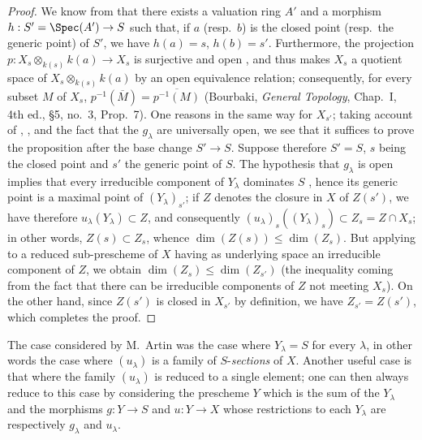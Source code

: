 \begin{proof}
We know from  that there exists a valuation ring $A'$ and a morphism $h:S'=\Spec(A')\to S$ such that, if $a$ (resp.\ $b$) is the closed point (resp.\ the generic point) of $S'$, we have $h(a)=s$, $h(b)=s'$.
Furthermore, the projection $p:X_s\otimes_{k(s)}k(a)\to X_s$ is surjective and open , and thus makes $X_s$ a quotient space of $X_s\otimes_{k(s)}k(a)$ by an open equivalence relation; consequently, for every subset $M$ of $X_s$, $p^{-1}(\overline{M})=\overline{p^{-1}(M)}$ (Bourbaki, \emph{General Topology}, Chap.~I, 4th ed., \S5, no.~3, Prop.~7).
One reasons in the same way for $X_{s'}$; taking account of , , and the fact that the $g_\lambda$ are universally open, we see that it suffices to prove the proposition after the base change $S'\to S$.
Suppose therefore $S'=S$, $s$ being the closed point and $s'$ the generic point of $S$.
The hypothesis that $g_\lambda$ is open implies that every irreducible component of $Y_\lambda$ dominates $S$ , hence its generic point is a maximal point of $(Y_\lambda)_{s'}$; if $Z$ denotes the closure in $X$ of $Z(s')$, we have therefore $u_\lambda(Y_\lambda)\subset Z$, and consequently $(u_\lambda)_s((Y_\lambda)_s)\subset Z_s=Z\cap X_s$; in other words, $Z(s)\subset Z_s$, whence $\dim(Z(s))\leq\dim(Z_s)$.
But applying  to a reduced sub-prescheme of $X$ having as underlying space an irreducible component of $Z$, we obtain $\dim(Z_s)\leq\dim(Z_{s'})$ (the inequality coming from the fact that there can be irreducible components of $Z$ not meeting $X_s$).
On the other hand, since $Z(s')$ is closed in $X_{s'}$ by definition, we have $Z_{s'}=Z(s')$, which completes the proof.
\end{proof}

\begin{remark}[14.3.12]
\label{IV.14.3.12}
The case considered by M.\ Artin was the case where $Y_\lambda=S$ for every $\lambda$, in other words the case where $(u_\lambda)$ is a family of $S$-\emph{sections} of $X$.
Another useful case is that where the family $(u_\lambda)$ is reduced to a single element; one can then always reduce to this case by considering the prescheme $Y$ which is the sum of the $Y_\lambda$ and the morphisms $g:Y\to S$ and $u:Y\to X$ whose restrictions to each $Y_\lambda$ are respectively $g_\lambda$ and $u_\lambda$.
\end{remark}

